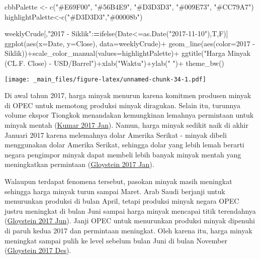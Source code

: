 \documentclass[
]{book}
\newenvironment{Shaded}{\begin{snugshade}}{\end{snugshade}}
\newcommand{\AttributeTok}[1]{\textcolor[rgb]{0.77,0.63,0.00}{#1}}
\newcommand{\ErrorTok}[1]{\textcolor[rgb]{0.64,0.00,0.00}{\textbf{#1}}}
\newcommand{\FunctionTok}[1]{\textcolor[rgb]{0.00,0.00,0.00}{#1}}
\newcommand{\NormalTok}[1]{#1}
\newcommand{\OtherTok}[1]{\textcolor[rgb]{0.56,0.35,0.01}{#1}}
\newcommand{\SpecialCharTok}[1]{\textcolor[rgb]{0.00,0.00,0.00}{#1}}
\newcommand{\StringTok}[1]{\textcolor[rgb]{0.31,0.60,0.02}{#1}}
\begin{document}
\begin{Shaded}
\begin{Highlighting}[]
\NormalTok{cbbPalette }\OtherTok{\textless{}{-}} \FunctionTok{c}\NormalTok{(}\StringTok{"\#E69F00"}\NormalTok{, }\StringTok{"\#56B4E9"}\NormalTok{, }\StringTok{"\#D3D3D3"}\NormalTok{, }\StringTok{"\#009E73"}\NormalTok{, }\StringTok{"\#CC79A7"}\NormalTok{)}
\NormalTok{highlightPalette}\OtherTok{\textless{}{-}}\FunctionTok{c}\NormalTok{(}\StringTok{"\#D3D3D3"}\NormalTok{,}\StringTok{"\#00008b"}\NormalTok{)}

\NormalTok{weeklyCrude[,}\StringTok{"2017 {-} Siklik"}\SpecialCharTok{:}\ErrorTok{=}\FunctionTok{ifelse}\NormalTok{(Date}\SpecialCharTok{\textless{}=}\FunctionTok{as.Date}\NormalTok{(}\StringTok{"2017{-}11{-}10"}\NormalTok{),T,F)]}
\FunctionTok{ggplot}\NormalTok{(}\FunctionTok{aes}\NormalTok{(}\AttributeTok{x=}\NormalTok{Date, }\AttributeTok{y=}\NormalTok{Close),}
       \AttributeTok{data=}\NormalTok{weeklyCrude)}\SpecialCharTok{+}
  \FunctionTok{geom\_line}\NormalTok{(}\FunctionTok{aes}\NormalTok{(}\AttributeTok{color=}\StringTok{\textasciigrave{}}\AttributeTok{2017 {-} Siklik}\StringTok{\textasciigrave{}}\NormalTok{))}\SpecialCharTok{+}\FunctionTok{scale\_color\_manual}\NormalTok{(}\AttributeTok{values=}\NormalTok{highlightPalette)}\SpecialCharTok{+}
  \FunctionTok{ggtitle}\NormalTok{(}\StringTok{"Harga Minyak (CL.F. Close) {-} USD/Barrel"}\NormalTok{)}\SpecialCharTok{+}\FunctionTok{xlab}\NormalTok{(}\StringTok{"Waktu"}\NormalTok{)}\SpecialCharTok{+}\FunctionTok{ylab}\NormalTok{(}\StringTok{" "}\NormalTok{)}\SpecialCharTok{+}
  \FunctionTok{theme\_bw}\NormalTok{()}
\end{Highlighting}
\end{Shaded}

\texttt{[image: \_main\_files/figure-latex/unnamed-chunk-34-1.pdf]}

Di awal tahun 2017, harga minyak menurun karena komitmen produsen minyak di OPEC untuk memotong produksi minyak diragukan. Selain itu, turunnya volume ekspor Tiongkok menandakan kemungkinan lemahnya permintaan untuk minyak mentah (\protect\hyperlink{ref-reu_oil_2017}{Kumar 2017 Jan}). Namun, harga minyak sedikit naik di akhir Januari 2017 karena melemahnya dolar Amerika Serikat - minyak dibeli menggunakan dolar Amerika Serikat, sehingga dolar yang lebih lemah berarti negara pengimpor minyak dapat membeli lebih banyak minyak mentah yang meningkatkan permintaan (\protect\hyperlink{ref-reu_oil_2017-1}{Gloystein 2017 Jan}).

Walaupun terdapat fenomena tersebut, pasokan minyak masih meningkat sehingga harga minyak turun sampai Maret. Arab Saudi berjanji untuk menurunkan produksi di bulan April, tetapi produksi minyak negara OPEC justru meningkat di bulan Juni sampai harga minyak mencapai titik terendahnya (\protect\hyperlink{ref-reu_oil_2017-4}{Gloystein 2017 Jun}). Janji OPEC untuk menurunkan produksi minyak dipenuhi di paruh kedua 2017 dan permintaan meningkat. Oleh karena itu, harga minyak meningkat sampai pulih ke level sebelum bulan Juni di bulan November (\protect\hyperlink{ref-reu_oil_2017-6}{Gloystein 2017 Des}).
\end{document}
